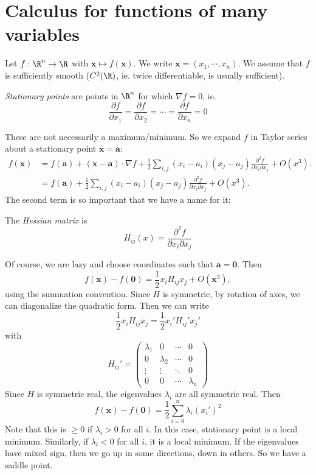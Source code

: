 \documentclass[a4paper]{article}
\begin{document}
\section{Calculus for functions of many variables}
Let $f: \R^n \to \R$ with $\mathbf{x} \mapsto f(\mathbf{x})$. We write $\mathbf{x} = (x_1, \cdots, x_n)$. We assume that $f$ is sufficiently smooth ($C^2(\R)$, ie. twice differentiable, is usually sufficient).  
\begin{defi}
  \emph{Stationary points} are points in $\R^n$ for which $\nabla f = 0$, ie.
  \[
    \frac{\partial f}{\partial x_1} = \frac{\partial f}{\partial x_2} = \cdots = \frac{\partial f}{\partial x_n} = 0
  \]
\end{defi}
These are not necessarily a maximum/minimum. So we expand $f$ in Taylor series about a stationary point $\mathbf{x} = \mathbf{a}$:
\begin{align*}
  f(\mathbf{x}) &= f(\mathbf{a}) + (\mathbf{x} - \mathbf{a})\cdot \nabla f + \frac{1}{2}\sum_{i, j}(x_i - a_i)(x_j - a_j)\frac{\partial^2 f}{\partial x_i \partial x_j} + O(x^3).\\
  &= f(\mathbf{a}) + \frac{1}{2}\sum_{i, j}(x_i - a_i)(x_j - a_j)\frac{\partial^2 f}{\partial x_i \partial x_j} + O(x^3).
\end{align*}
The second term is so important that we have a name for it:
\begin{defi}
  The \emph{Hessian matrix} is
  \[
    H_{ij}(x) = \frac{\partial^2 f}{\partial x_i \partial x_j}
  \]
\end{defi}
Of course, we are lazy and choose coordinates such that $\mathbf{a} = \mathbf{0}$. Then
\[
  f(\mathbf{x}) - f(\mathbf{0}) = \frac{1}{2}x_i H_{ij}x_j + O(\mathbf{x}^3),
\]
using the summation convention. Since $H$ is symmetric, by rotation of axes, we can diagonalize the quadratic form. Then we can write
\[
  \frac{1}{2}x_i H_{ij}x_j = \frac{1}{2}x_i' H_{ij}'x_j'
\]
with
\[
  H_{ij}' = 
  \begin{pmatrix}
    \lambda_1 & 0 & \cdots & 0\\
    0 & \lambda_2 & \cdots & 0\\
    \vdots & \vdots & \ddots & 0\\
    0 & 0 & \cdots & \lambda_n
  \end{pmatrix}
\]
Since $H$ is symmetric real, the eigenvalues $\lambda_i$ are all symmetric real. Then
\[
  f(\mathbf{x}) - f(\mathbf{0}) = \frac{1}{2}\sum_{i = 0}^n \lambda_i (x_i')^2
\]
Note that this is $\geq 0$ if $\lambda_i > 0$ for all $i$. In this case, stationary point is a local minimum. Similarly, if $\lambda_i < 0$ for all $i$, it is a local minimum. If the eigenvalues have mixed sign, then we go up in some directions, down in others. So we have a saddle point.
\end{document}
